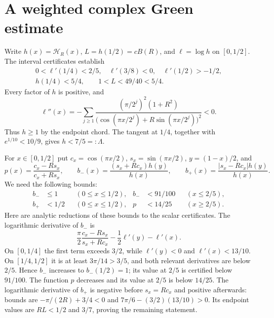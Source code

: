 \documentclass[11pt,a4paper]{article}
\theoremstyle{remark}\newtheorem*{ednote}{Editorial note (ProveIt, 2026-10-01)}
\begin{document}
\section{A weighted complex Green estimate}
Write $h(x)=\mathcal H_R(x)$, $L=h(1/2)=cB(R)$, and $\ell=\log h$ on $[0,1/2]$. The interval certificates establish
\begin{gather}
 0<\ell'(1/4)<2/5,\quad \ell'(3/8)<0,\quad
 \ell'(1/2)>-1/2,\label{eq:scalar1}\\
 h(1/4)<5/4,\qquad 1<L<49/40<5/4.\label{eq:scalar2}
\end{gather}
Every factor of $h$ is positive, and
\[
 \ell''(x)=-\sum_{j\ge1}\frac{(\pi/2^j)^2(1+R^2)}
 {\bigl(\cos(\pi x/2^j)+R\sin(\pi x/2^j)\bigr)^2}<0.
\]
Thus $h\ge1$ by the endpoint chord. The tangent at $1/4$, together with $e^{1/10}<10/9$, gives $h<7/5=: \Lambda$.

For $x\in[0,1/2]$ put $c_x=\cos(\pi x/2)$, $s_x=\sin(\pi x/2)$, $y=(1-x)/2$, and
\[
 p(x)=\frac{c_x-Rs_x}{c_x+Rs_x},\qquad
 b_-(x)=\frac{(s_x+Rc_x)h(y)}{h(x)},\qquad
 b_+(x)=\frac{|s_x-Rc_x|h(y)}{h(x)}.
\]
We need the following bounds:
\begin{equation}\label{eq:scalarbranches}
 \begin{aligned}
 b_-&\le1&& (0\le x\le1/2),& b_-&<91/100&&(x\le2/5),\\
 b_+&<1/2&&(0\le x\le1/2),& p&<14/25&&(x\ge2/5).
 \end{aligned}
\end{equation}
Here are analytic reductions of these bounds to the scalar certificates. The logarithmic derivative of $b_-$ is
\[
 \frac{\pi}{2}\frac{c_x-Rs_x}{s_x+Rc_x}
       -\frac12\ell'(y)-\ell'(x).
\]
On $[0,1/4]$ the first term exceeds $3/2$, while $\ell'(y)<0$ and $\ell'(x)<13/10$. On $[1/4,1/2]$ it is at least $3\pi/14>3/5$, and both relevant derivatives are below $2/5$. Hence $b_-$ increases to $b_-(1/2)=1$; its value at $2/5$ is certified below $91/100$. The function $p$ decreases and its value at $2/5$ is below $14/25$. The logarithmic derivative of $b_+$ is negative before $s_x=Rc_x$ and positive afterwards: bounds are $-\pi/(2R)+3/4<0$ and $7\pi/6-(3/2)(13/10)>0$. Its endpoint values are $RL<1/2$ and $3/7$, proving the remaining statement.
\end{document}
